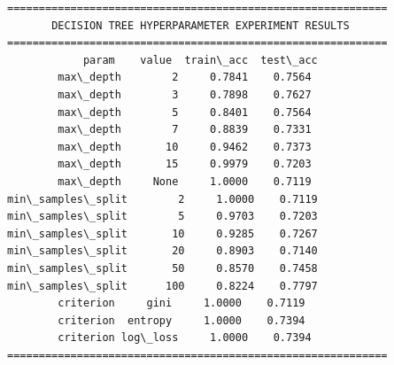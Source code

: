 \documentclass[11pt]{article}
\begin{document}
    \begin{Verbatim}[commandchars=\\\{\}]
============================================================
       DECISION TREE HYPERPARAMETER EXPERIMENT RESULTS
============================================================
            param    value  train\_acc  test\_acc
        max\_depth        2     0.7841    0.7564
        max\_depth        3     0.7898    0.7627
        max\_depth        5     0.8401    0.7564
        max\_depth        7     0.8839    0.7331
        max\_depth       10     0.9462    0.7373
        max\_depth       15     0.9979    0.7203
        max\_depth     None     1.0000    0.7119
min\_samples\_split        2     1.0000    0.7119
min\_samples\_split        5     0.9703    0.7203
min\_samples\_split       10     0.9285    0.7267
min\_samples\_split       20     0.8903    0.7140
min\_samples\_split       50     0.8570    0.7458
min\_samples\_split      100     0.8224    0.7797
        criterion     gini     1.0000    0.7119
        criterion  entropy     1.0000    0.7394
        criterion log\_loss     1.0000    0.7394
============================================================
    \end{Verbatim}
\end{document}
